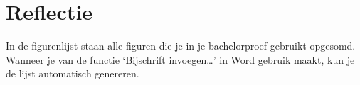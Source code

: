\chapter{Reflectie}
In de figurenlijst staan alle figuren die je in je bachelorproef gebruikt
opgesomd. Wanneer je van de functie ‘Bijschrift invoegen…’ in Word gebruik 
maakt, kun je de lijst automatisch genereren.
